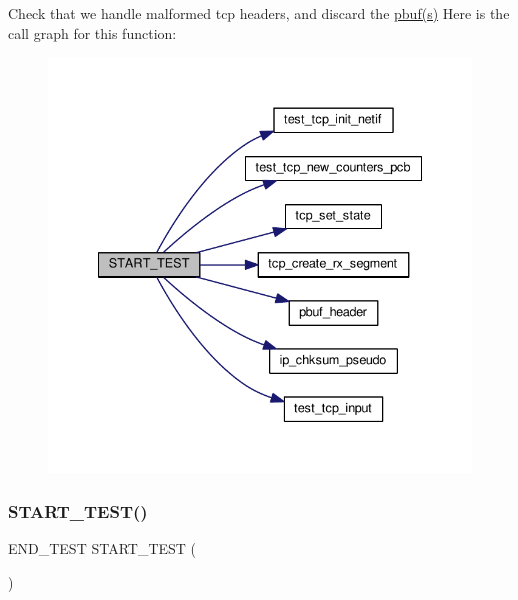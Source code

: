 Check that we handle malformed tcp headers, and discard the \hyperlink{structpbuf}{pbuf(s)} Here is the call graph for this function\+:
\nopagebreak
\begin{figure}[H]
\begin{center}
\leavevmode
\includegraphics[width=335pt]{openmote-cc2538_2lwip_2test_2unit_2tcp_2test__tcp_8c_a22b7d73dfb2feb77f981da6749639ce6_cgraph}
\end{center}
\end{figure}
\mbox{\label{openmote-cc2538_2lwip_2test_2unit_2tcp_2test__tcp_8c_a1d7ed7e7a4d8e4063e482d6bacd3f72b}} 
\subsubsection{\texorpdfstring{S\+T\+A\+R\+T\+\_\+\+T\+E\+S\+T()}{START\_TEST()}\hspace{0.1cm}{\footnotesize\ttfamily [4/8]}}
{\footnotesize\ttfamily E\+N\+D\+\_\+\+T\+E\+ST S\+T\+A\+R\+T\+\_\+\+T\+E\+ST (\begin{DoxyParamCaption}\item[{test\+\_\+tcp\+\_\+fast\+\_\+retx\+\_\+recover}]{ }\end{DoxyParamCaption})}

